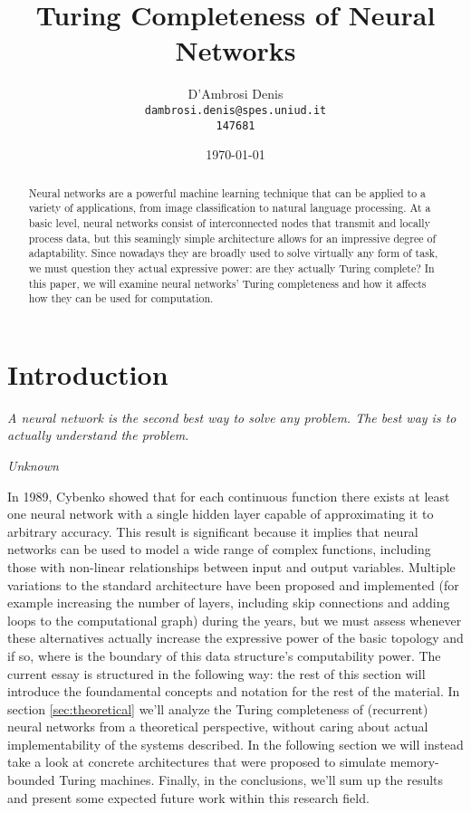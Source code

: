 \documentclass{article}
\title{Turing Completeness of Neural Networks}
\author{D'Ambrosi Denis \\ \small \texttt{dambrosi.denis@spes.uniud.it} \\ \small \texttt{147681}}
\date{\today}
\begin{document}
\maketitle

\begin{abstract}
    Neural networks are a powerful machine learning technique that can be applied to a variety of applications, from image classification to natural language processing. At a basic level, neural networks consist of interconnected nodes that transmit and locally process data, but this seamingly simple architecture allows for an impressive degree of adaptability. Since nowadays they are broadly used to solve virtually any form of task, we must question they actual expressive power: are they actually Turing complete?
    In this paper, we will examine neural networks' Turing completeness and how it affects how they can be used for computation.
\end{abstract}

\tableofcontents

\newpage

\section{Introduction}

\epigraph{\textit{A neural network is the second best way to solve any problem. The best way is to actually understand the problem.}}{\textit{Unknown}}

In 1989, Cybenko \cite{CYB89} showed that for each continuous function there exists at least one neural network with a single hidden layer capable of approximating it to arbitrary accuracy. This result is significant because it implies that neural networks can be used to model a wide range of complex functions, including those with non-linear relationships between input and output variables. 
Multiple variations to the standard architecture have been proposed and implemented (for example increasing the number of layers, including skip connections and adding loops to the computational graph) during the years, but we must assess whenever these alternatives actually increase the expressive power of the basic topology and if so, where is the boundary of this data structure's computability power.
The current essay is structured in the following way: the rest of this section will introduce the foundamental concepts and notation for the rest of the material. In section \ref{sec:theoretical} we'll analyze the Turing completeness of (recurrent) neural networks from a theoretical perspective, without caring about actual implementability of the systems described. In the following section we will instead take a look at concrete architectures that were proposed to simulate memory-bounded Turing machines. Finally, in the conclusions, we'll sum up the results and present some expected future work within this research field.
\end{document}
